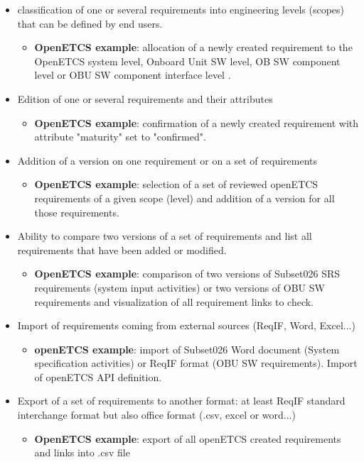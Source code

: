 \documentclass[11pt]{template/openetcs_report}
\begin{document}
\begin{itemize}
\item classification of one or several requirements into engineering levels (scopes) that can be defined by end users.
\begin{itemize} \item \textbf{OpenETCS example}: allocation of a newly created requirement to the OpenETCS system level, Onboard Unit SW level, OB SW component level or OBU SW component interface level .\end{itemize}

\item Edition of one or several requirements and their attributes
\begin{itemize} \item \textbf{OpenETCS example}: confirmation of a newly created requirement with attribute "maturity" set to "confirmed".\end{itemize}

\item Addition of a version on one requirement or on a set of requirements
\begin{itemize} \item \textbf{OpenETCS example}: selection of a set of reviewed openETCS requirements of a given scope (level) and addition of a version for all those requirements.\end{itemize}

\item Ability to compare two versions of a set of requirements and list all requirements that have been added or modified.
\begin{itemize} \item \textbf{OpenETCS example}: comparison of two versions of Subset026 SRS requirements (system input activities) or two versions of OBU SW requirements and visualization of all requirement links to check.\end{itemize}

\item Import of requirements coming from external sources (ReqIF, Word, Excel...)
\begin{itemize} \item \textbf{openETCS example}: import of Subset026 Word document (System specification activities) or ReqIF format (OBU SW requirements). Import of openETCS API definition.\end{itemize}

\item Export of a set of requirements to another format: at least ReqIF standard interchange format but also office format (.csv, excel or word...) \begin{itemize} \item \textbf{OpenETCS example}: export of all openETCS created requirements and links into .csv file \end{itemize}

\end{itemize}
\end{document}
